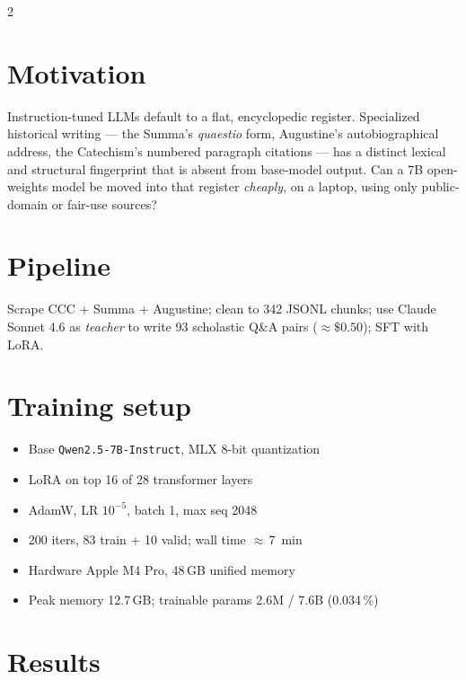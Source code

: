 \documentclass[a4paper,9pt]{extarticle}
\begin{document}
\begin{multicols}{2}
\raggedcolumns

\section*{Motivation}
Instruction-tuned LLMs default to a flat, encyclopedic register.
Specialized historical writing --- the Summa's \emph{quaestio} form,
Augustine's autobiographical address, the Catechism's numbered paragraph
citations --- has a distinct lexical and structural fingerprint that is
absent from base-model output. Can a 7B open-weights model be moved into
that register \emph{cheaply}, on a laptop, using only public-domain or
fair-use sources?

\section*{Pipeline}
\begin{center}
\resizebox{0.7\linewidth}{!}{}
\end{center}
\vspace{-0.4em}
\noindent Scrape CCC + Summa + Augustine; clean to 342 JSONL chunks;
use Claude Sonnet 4.6 as \emph{teacher} to write 93 scholastic Q\&A
pairs ($\approx\$0.50$); SFT with LoRA.

\section*{Training setup}
\begin{itemize}
  \item Base \texttt{Qwen2.5-7B-Instruct}, MLX 8-bit quantization
  \item LoRA on top 16 of 28 transformer layers
  \item AdamW, LR $10^{-5}$, batch 1, max seq 2048
  \item 200 iters, 83 train + 10 valid; wall time $\approx$\,7~min
  \item Hardware Apple M4 Pro, 48\,GB unified memory
  \item Peak memory 12.7\,GB; trainable params 2.6M / 7.6B (0.034\,\%)
\end{itemize}

\columnbreak

\section*{Results}
\begin{center}
\resizebox{0.95\linewidth}{!}{}
\end{center}
\vspace{-0.6em}


\end{multicols}
\end{document}
